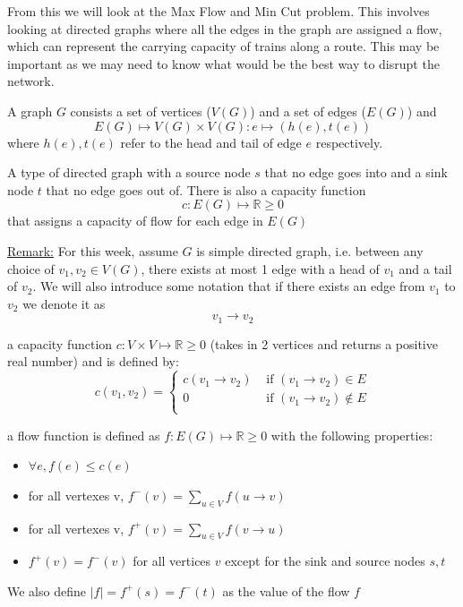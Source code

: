 \documentclass[12pt]{article}
\begin{document}
From this we will look at the Max Flow and Min Cut problem. This involves looking at directed graphs where all the edges in the graph are assigned a flow, which can represent the carrying capacity of trains along a route. This may be important as we may need to know what would be the best way to disrupt the network.

\begin{tcolorbox}[title=Definition: Directed Graph]
	A graph $G$ consists a set of vertices ($V(G)$) and a set of edges ($E(G)$) and
	$$E(G) \mapsto V(G) \times V(G) : e \mapsto (h(e), t(e))$$ where $h(e), t(e)$ refer to the head and tail of edge $e$ respectively.
\end{tcolorbox}

\begin{tcolorbox}[title=Definition: Network]
	A type of directed graph with a source node $s$ that no edge goes into and a sink node $t$ that no edge goes out of. There is also a capacity function $$c : E(G) \mapsto \mathbb{R} \geq 0$$ that assigns a capacity of flow for each edge in $E(G)$
\end{tcolorbox}

\begin{tcolorbox}
	\underline{Remark:} For this week, assume $G$ is simple directed graph, i.e. between any choice of $v_1,v_2 \in V(G)$, there exists at most 1 edge with a head of $v_1$ and a tail of $v_2$. We will also introduce some notation that if there exists an edge from $v_1$ to $v_2$ we denote it as $$v_1 \rightarrow v_2$$
\end{tcolorbox}

\begin{tcolorbox}[title=Definition: Capacity function]
	a capacity function $c: V \times V \mapsto \mathbb{R}\geq 0$ (takes in 2 vertices and returns a positive real number) and is defined by:
	$$c(v_1, v_2) = \begin{cases}
		c(v_1 \rightarrow v_2) &\text{ if }  (v_1 \rightarrow v_2)\in E\\
		0 &\text{ if }  (v_1 \rightarrow v_2)\not\in E\\
	\end{cases}
$$
\end{tcolorbox}
\begin{tcolorbox}[title=Definition: Flow $f$]
	a flow function is defined as $f: E(G) \mapsto \mathbb{R} \geq 0$ with the following properties:
	\begin{itemize}
		\item{$\forall e, f(e) \leq c(e)$}
		\item{for all vertexes v, $f^-(v) = \sum_{u \in V} f(u \rightarrow v)$}
		\item{for all vertexes v, $f^+(v) = \sum_{u \in V} f(v \rightarrow u)$}
		\item{$f^+(v) = f^-(v)$ for all vertices $v$ except for the sink and source nodes $s,t$}
	\end{itemize}
We also define $|f| = f^+(s)=f^-(t)$ as the value of the flow $f$
\end{tcolorbox}
\end{document}
